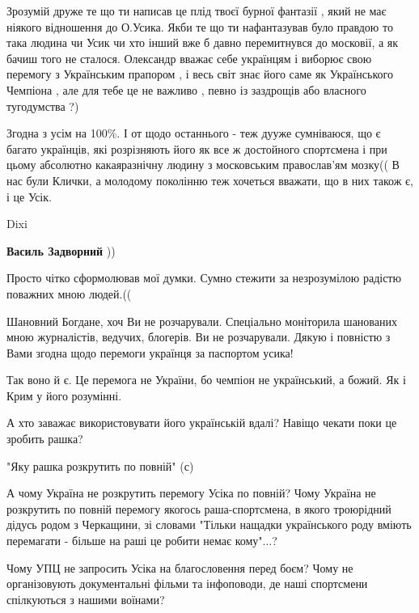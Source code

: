 \begin{itemize}

Зрозумій друже те що ти написав це плід твоєї бурної фантазії , який не має
ніякого відношення до О.Усика. Якби те що ти нафантазував було правдою то така
людина чи Усик чи хто інший вже б давно перемитнувся до московії, а як бачиш
того не сталося. Олександр вважає себе українцям і виборює свою перемогу з
Українським прапором , і весь світ знає його саме як Українського Чемпіона ,
але для тебе це не важливо , певно із заздрощів або власного тугодумства ?)



Згодна з усім на 100\%. І от щодо останнього - теж дууже сумніваюся, що є багато
українців, які розрізняють його як все ж достойного спортсмена і при цьому
абсолютно какаяразнічну людину з московським православ'ям мозку(( В нас були
Клички, а молодому поколінню теж хочеться вважати, що в них також є, і це Усік.


Dixi

\begin{itemize} %
\textbf{Василь Задворний} ))
\end{itemize} %

Просто чітко сформолював мої думки. Сумно стежити за незрозумілою радістю поважних мною людей.((


Шановний Богдане, хоч Ви не розчарували. Спеціально моніторила шанованих мною
журналістів, ведучих, блогерів. Ви не розчарували. Дякую і повністю з Вами
згодна щодо перемоги українця за паспортом усика!


Так воно й є. Це перемога не України, бо чемпіон не український, а божий. Як і Крим у його розумінні.

А хто заважає використовувати його українській вдалі? Навіщо чекати поки це зробить рашка?


"Яку рашка розкрутить по повній" (с)

А чому Україна не розкрутить перемогу Усіка по повній? Чому Україна не
розкрутить по повній перемогу якогось раша-спортсмена, в якого троюрідний
дідусь родом з Черкащини, зі словами "Тільки нащадки українського роду вміють
перемагати - більше на раші це робити немає кому"...?

Чому УПЦ не запросить Усіка на благословення перед боєм? Чому не організовують
документальні фільми та інфоповоди, де наші спортсмени спілкуються з нашими
воїнами?


\end{itemize}
